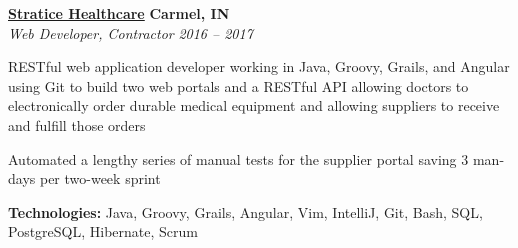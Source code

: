 %
    \headerrow
        {\textbf{\href{https://www.straticehealthcare.com/}{Stratice Healthcare}}}
        {\textbf{Carmel, IN}}
    \\
    \headerrow
        {\emph{Web Developer, Contractor}}
        {\emph{2016 -- 2017}}
    \begin{itemize*}
        \item RESTful web application developer working in Java, Groovy, Grails, and Angular using Git to build two
            web portals and a RESTful API allowing doctors to electronically order durable medical equipment and
            allowing suppliers to receive and fulfill those orders
        \item Automated a lengthy series of manual tests for the supplier portal saving 3 man-days per two-week sprint
    \end{itemize*}

    \hspace{1.0em}
        {\textbf{Technologies:} Java, Groovy, Grails, Angular, Vim, IntelliJ, Git, Bash, SQL, PostgreSQL, Hibernate, Scrum}
